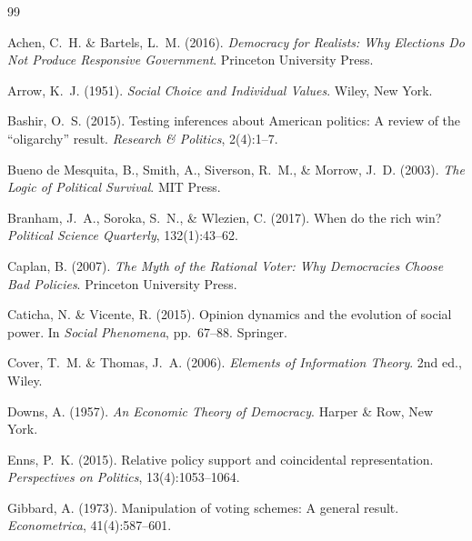 \documentclass[twocolumn,10pt]{article}
\begin{document}
\begin{thebibliography}{99}

Achen, C.~H. \& Bartels, L.~M. (2016).
\newblock \emph{Democracy for Realists: Why Elections Do Not Produce Responsive Government}.
\newblock Princeton University Press.

Arrow, K.~J. (1951).
\newblock \emph{Social Choice and Individual Values}.
\newblock Wiley, New York.

Bashir, O.~S. (2015).
\newblock Testing inferences about {A}merican politics: A review of the ``oligarchy'' result.
\newblock \emph{Research \& Politics}, 2(4):1--7.

Bueno de Mesquita, B., Smith, A., Siverson, R.~M., \& Morrow, J.~D. (2003).
\newblock \emph{The Logic of Political Survival}.
\newblock MIT Press.

Branham, J.~A., Soroka, S.~N., \& Wlezien, C. (2017).
\newblock When do the rich win?
\newblock \emph{Political Science Quarterly}, 132(1):43--62.

Caplan, B. (2007).
\newblock \emph{The Myth of the Rational Voter: Why Democracies Choose Bad Policies}.
\newblock Princeton University Press.

Caticha, N. \& Vicente, R. (2015).
\newblock Opinion dynamics and the evolution of social power.
\newblock In \emph{Social Phenomena}, pp.~67--88. Springer.

Cover, T.~M. \& Thomas, J.~A. (2006).
\newblock \emph{Elements of Information Theory}.
\newblock 2nd ed., Wiley.

Downs, A. (1957).
\newblock \emph{An Economic Theory of Democracy}.
\newblock Harper \& Row, New York.

Enns, P.~K. (2015).
\newblock Relative policy support and coincidental representation.
\newblock \emph{Perspectives on Politics}, 13(4):1053--1064.

Gibbard, A. (1973).
\newblock Manipulation of voting schemes: A general result.
\newblock \emph{Econometrica}, 41(4):587--601.


\end{thebibliography}
\end{document}
